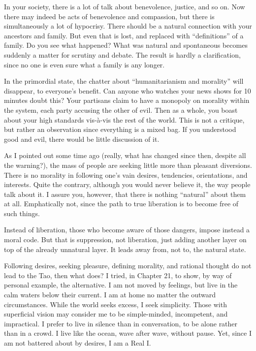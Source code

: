 In your society, there is a lot of talk about benevolence, justice, and so on. Now there may indeed be acts of benevolence and compassion, but there is simultaneously a lot of hypocrisy. There should be a natural connection with your ancestors and family. But even that is lost, and replaced with ``definitions'' of a family. Do you see what happened? What was natural and spontaneous becomes suddenly a matter for scrutiny and debate. The result is hardly a clarification, since no one is even sure what a family is any longer.

In the primordial state, the chatter about ``humanitarianism and morality'' will disappear, to everyone's benefit. Can anyone who watches your news shows for 10 minutes doubt this? Your partisans claim to have a monopoly on morality within the system, each party accusing the other of evil. Then as a whole, you boast about your high standards vis-à-vis the rest of the world. This is not a critique, but rather an observation since everything is a mixed bag. If you understood good and evil, there would be little discussion of it.

As I pointed out some time ago (really, what has changed since then, despite all the warning?), the mass of people are seeking little more than pleasant diversions. There is no morality in following one's vain desires, tendencies, orientations, and interests. Quite the contrary, although you would never believe it, the way people talk about it. I assure you, however, that there is nothing ``natural'' about them at all. Emphatically not, since the path to true liberation is to become free of such things.

Instead of liberation, those who become aware of those dangers, impose instead a moral code. But that is suppression, not liberation, just adding another layer on top of the already unnatural layer. It leads away from, not to, the natural state.

Following desires, seeking pleasure, defining morality, and rational thought do not lead to the Tao, then what does? I tried, in Chapter 21, to show, by way of personal example, the alternative. I am not moved by feelings, but live in the calm waters below their current. I am at home no matter the outward circumstances. While the world seeks excess, I seek simplicity. Those with superficial vision may consider me to be simple-minded, incompetent, and impractical. I prefer to live in silence than in conversation, to be alone rather than in a crowd. I live like the ocean, wave after wave, without pause. Yet, since I am not battered about by desires, I am a Real I.

